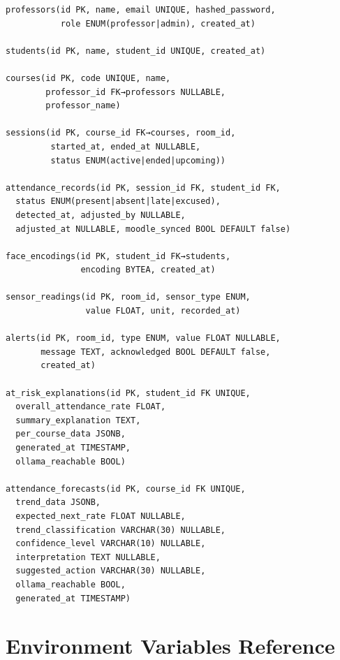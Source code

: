 \begin{verbatim}
professors(id PK, name, email UNIQUE, hashed_password,
           role ENUM(professor|admin), created_at)

students(id PK, name, student_id UNIQUE, created_at)

courses(id PK, code UNIQUE, name,
        professor_id FK→professors NULLABLE,
        professor_name)

sessions(id PK, course_id FK→courses, room_id,
         started_at, ended_at NULLABLE,
         status ENUM(active|ended|upcoming))

attendance_records(id PK, session_id FK, student_id FK,
  status ENUM(present|absent|late|excused),
  detected_at, adjusted_by NULLABLE,
  adjusted_at NULLABLE, moodle_synced BOOL DEFAULT false)

face_encodings(id PK, student_id FK→students,
               encoding BYTEA, created_at)

sensor_readings(id PK, room_id, sensor_type ENUM,
                value FLOAT, unit, recorded_at)

alerts(id PK, room_id, type ENUM, value FLOAT NULLABLE,
       message TEXT, acknowledged BOOL DEFAULT false,
       created_at)

at_risk_explanations(id PK, student_id FK UNIQUE,
  overall_attendance_rate FLOAT,
  summary_explanation TEXT,
  per_course_data JSONB,
  generated_at TIMESTAMP,
  ollama_reachable BOOL)

attendance_forecasts(id PK, course_id FK UNIQUE,
  trend_data JSONB,
  expected_next_rate FLOAT NULLABLE,
  trend_classification VARCHAR(30) NULLABLE,
  confidence_level VARCHAR(10) NULLABLE,
  interpretation TEXT NULLABLE,
  suggested_action VARCHAR(30) NULLABLE,
  ollama_reachable BOOL,
  generated_at TIMESTAMP)
\end{verbatim}

\section{Environment Variables Reference}
\label{app:env}

